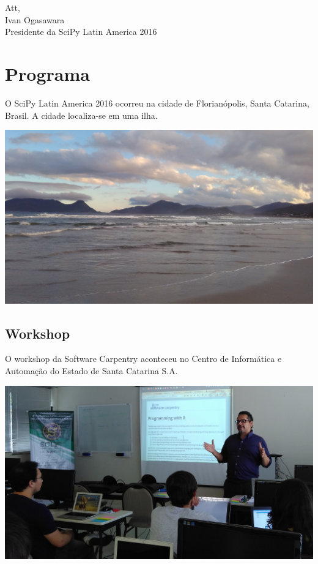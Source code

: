 \documentclass[12pt]{article}
\begin{document}
Att, \\
\indent Ivan Ogasawara \\
\indent Presidente da SciPy Latin America 2016


\newpage

\section*{Programa}

O SciPy Latin America 2016 ocorreu na cidade de Florianópolis, Santa Catarina,
Brasil. A cidade localiza-se em uma ilha.

\noindent  %
\includegraphics[width=\textwidth]{venue-beach.jpg}

\subsection*{Workshop}

O workshop da Software Carpentry aconteceu no Centro de Informática e Automação
do Estado de Santa Catarina S.A.

\noindent  %
\includegraphics[width=\textwidth]{swc-francisco.jpg}
\end{document}
